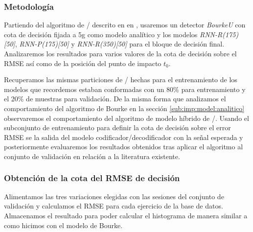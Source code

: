 \subsubsection{Metodología}

Partiendo del algoritmo de \ifell/ descrito en en , usaremos un detector \textit{BourkeU} con cota de decisión fijada a 5g como modelo analítico y los modelos \textit{RNN-R(175)[50]}, \textit{RNN-P(175)[50]} y \textit{RNN-R(350)[50]} para el bloque de decisión final. Analizaremos los resultados para varios valores de la cota de decisión sobre el RMSE así como de la posición del punto de impacto $t_0$.

Recuperamos las mismas particiones de \sisfall/ hechas para el entrenamiento de los modelos que recordemos estaban conformadas con un 80\% para entrenamiento y el 20\% de muestras para validación. De la misma forma que analizamos el comportamiento del algoritmo de Bourke en la sección \ref{sub:imp:model:analitico} observaremos el comportamiento del algoritmo de modelo híbrido de \ifell/. Usando el subconjunto de entrenamiento para definir la cota de decisión sobre el error RMSE se la salida del modelo codificador/decodificador con la señal esperada y posteriormente evaluaremos los resultados obtenidos tras aplicar el algoritmo al conjunto de validación en relación a la literatura existente.

\subsubsection{Obtención de la cota del RMSE de decisión}

Alimentamos las tres variaciones elegidas con las sesiones del conjunto de validación y calculamos el RMSE para cada ejercicio de la base de datos. Almacenamos el resultado para poder calcular el histograma de manera similar a como hicimos con el modelo de Bourke.

